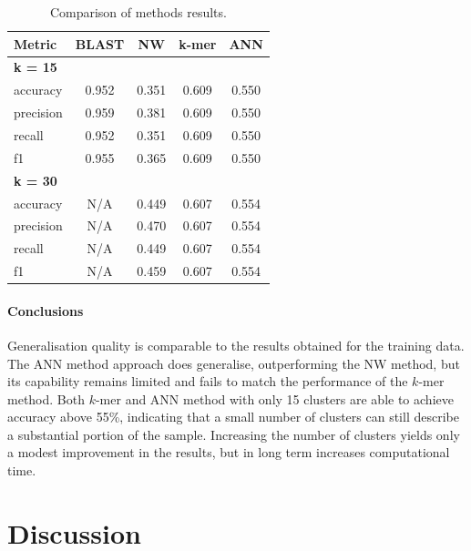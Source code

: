 \documentclass[biomedinformatics,article,submit,moreauthors]{Definitions/mdpi}
\begin{document}
            \begin{table}[htbp]
                \centering
                \begin{tabular}{lcccc}
                    \hline
                    Metric & BLAST & NW & k-mer & ANN \\
                    \hline
                    \multicolumn{5}{l}{\textbf{k = 15}} \\
                    \hline
                    accuracy & 0.952 & 0.351 & 0.609 & 0.550 \\
                    precision & 0.959 & 0.381 & 0.609 & 0.550 \\
                    recall & 0.952 & 0.351 & 0.609 & 0.550 \\
                    f1 & 0.955 & 0.365 & 0.609 & 0.550 \\
                    \hline
                    \multicolumn{5}{l}{\textbf{k = 30}} \\
                    \hline
                    accuracy & N/A & 0.449 & 0.607 & 0.554 \\
                    precision & N/A & 0.470 & 0.607 & 0.554 \\
                    recall & N/A & 0.449 & 0.607 & 0.554 \\
                    f1 & N/A & 0.459 & 0.607 & 0.554 \\
                    \hline
                    \end{tabular}
                \caption{Comparison of methods results.}
                \label{Table:Experiment:GeneralisationAndKParameter}
            \end{table}

            \paragraph{Conclusions}
            Generalisation quality is comparable to the results obtained for the training data. The ANN method approach does generalise, outperforming the NW method, but its capability remains limited and fails to match the performance of the $k$-mer method.
            Both $k$-mer and ANN method with only 15 clusters are able to achieve accuracy above 55\%, indicating that a small number of clusters can still describe a substantial portion of the sample. 
            Increasing the number of clusters yields only a modest improvement in the results, but in long term increases computational time.


    \section{Discussion}
\end{document}
